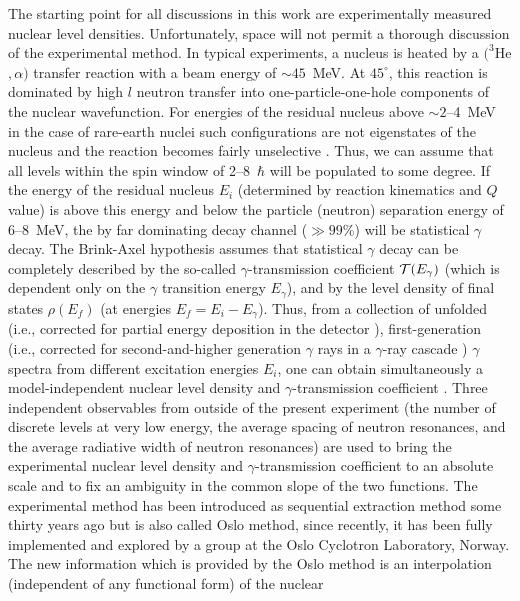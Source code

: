 \documentclass[sort&compress,final,numberedheadings]{aipproc}
\begin{document}
The starting point for all discussions in this work are experimentally measured
nuclear level densities. Unfortunately, space will not permit a thorough 
discussion of the experimental method. In typical experiments, a nucleus is 
heated by a $(^3$He$,\alpha)$ transfer reaction with a beam energy of 
$\sim 45$~MeV\@. At $45^\circ$, this reaction is dominated by high $l$ neutron 
transfer into one-particle-one-hole components of the nuclear wavefunction. For
energies of the residual nucleus above $\sim 2$--4~MeV in the case of 
rare-earth nuclei such configurations are not eigenstates of the nucleus and 
the reaction becomes fairly unselective \cite{RN84}. Thus, we can assume that 
all levels within the spin window of 2--8~$\hbar$ will be populated to some 
degree. If the energy of the residual nucleus $E_i$ (determined by reaction 
kinematics and $Q$ value) is above this energy and below the particle (neutron)
separation energy of 6--8~MeV, the by far dominating decay channel ($\gg 99$\%)
will be statistical $\gamma$ decay. The Brink-Axel hypothesis \cite{Br55+Ax62} 
assumes that statistical $\gamma$ decay can be completely described by the 
so-called $\gamma$-transmission coefficient ${\cal{T}}(E_\gamma)$ (which is 
dependent only on the $\gamma$ transition energy $E_\gamma$), and by the level 
density of final states $\rho(E_f)$ (at energies $E_f=E_i-E_\gamma$). Thus, 
from a collection of unfolded (i.e., corrected for partial energy deposition in
the detector \cite{GT96}), first-generation (i.e., corrected for 
second-and-higher generation $\gamma$ rays in a $\gamma$-ray cascade 
\cite{GR87}) $\gamma$ spectra from different excitation energies $E_i$, one can
obtain simultaneously a model-independent nuclear level density and 
$\gamma$-transmission coefficient \cite{HB95,SB00}. Three independent 
observables from outside of the present experiment (the number of discrete 
levels at very low energy, the average spacing of neutron resonances, and the 
average radiative width of neutron resonances) are used to bring the 
experimental nuclear level density and $\gamma$-transmission coefficient to an 
absolute scale and to fix an ambiguity in the common slope of the two 
functions. The experimental method has been introduced as sequential extraction
method some thirty years ago \cite{BA73} but is also called Oslo method, since 
recently, it has been fully implemented and explored by a group at the Oslo 
Cyclotron Laboratory, Norway. The new information which is provided by the Oslo
method is an interpolation (independent of any functional form) of the nuclear 
\end{document}
